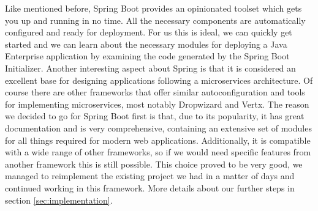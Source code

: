 \documentclass[12pt]{article}
\begin{document}
Like mentioned before, Spring Boot provides an opinionated toolset which gets you up and running in no time. All the necessary components are automatically configured and ready for deployment. For us this is ideal, we can quickly get started and we can learn about the necessary modules for deploying a Java Enterprise application by examining the code generated by the Spring Boot Initializer. Another interesting aspect about Spring is that it is considered an excellent base for designing applications following a microservices architecture. \cite{SpringMicroservices35:online} \cite{MicroservicesFrameworks85:online} Of course there are other frameworks that offer similar autoconfiguration and tools for implementing microservices, most notably Dropwizard and Vertx. The reason we decided to go for Spring Boot first is that, due to its popularity, it has great documentation and is very comprehensive, containing an extensive set of modules for all things required for modern web applications. Additionally, it is compatible with a wide range of other frameworks, so if we would need specific features from another framework this is still possible. This choice proved to be very good, we managed to reimplement the existing project we had in a matter of days and continued working in this framework. More details about our further steps in section \ref{sec:implementation}.
\end{document}
